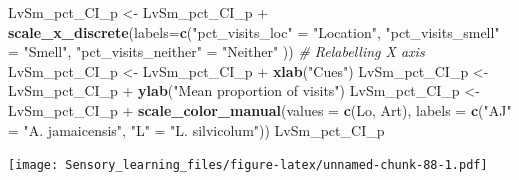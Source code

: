 \documentclass[]{article}
\newenvironment{Shaded}{\begin{snugshade}}{\end{snugshade}}
\newcommand{\KeywordTok}[1]{\textcolor[rgb]{0.13,0.29,0.53}{\textbf{{#1}}}}
\newcommand{\DataTypeTok}[1]{\textcolor[rgb]{0.13,0.29,0.53}{{#1}}}
\newcommand{\StringTok}[1]{\textcolor[rgb]{0.31,0.60,0.02}{{#1}}}
\newcommand{\CommentTok}[1]{\textcolor[rgb]{0.56,0.35,0.01}{\textit{{#1}}}}
\newcommand{\NormalTok}[1]{{#1}}
\begin{document}
\begin{Shaded}
\begin{Highlighting}[]
\NormalTok{LvSm_pct_CI_p <-}\StringTok{ }\NormalTok{LvSm_pct_CI_p +}\StringTok{ }\KeywordTok{scale_x_discrete}\NormalTok{(}\DataTypeTok{labels=}\KeywordTok{c}\NormalTok{(}\StringTok{"pct_visits_loc"} \NormalTok{=}\StringTok{ "Location"}\NormalTok{, }\StringTok{"pct_visits_smell"} \NormalTok{=}\StringTok{ "Smell"}\NormalTok{,}
                              \StringTok{"pct_visits_neither"} \NormalTok{=}\StringTok{ "Neither"} \NormalTok{))  }\CommentTok{# Relabelling X axis}
\NormalTok{LvSm_pct_CI_p <-}\StringTok{ }\NormalTok{LvSm_pct_CI_p +}\StringTok{ }\KeywordTok{xlab}\NormalTok{(}\StringTok{"Cues"}\NormalTok{)}
\NormalTok{LvSm_pct_CI_p <-}\StringTok{ }\NormalTok{LvSm_pct_CI_p +}\StringTok{ }\KeywordTok{ylab}\NormalTok{(}\StringTok{"Mean proportion of visits"}\NormalTok{)}
\NormalTok{LvSm_pct_CI_p <-}\StringTok{ }\NormalTok{LvSm_pct_CI_p +}\StringTok{ }\KeywordTok{scale_color_manual}\NormalTok{(}\DataTypeTok{values =} \KeywordTok{c}\NormalTok{(Lo, Art), }\DataTypeTok{labels =} \KeywordTok{c}\NormalTok{(}\StringTok{"AJ"} \NormalTok{=}\StringTok{ "A. jamaicensis"}\NormalTok{, }\StringTok{"L"} \NormalTok{=}\StringTok{ "L. silvicolum"}\NormalTok{))}
\NormalTok{LvSm_pct_CI_p                    }
\end{Highlighting}
\end{Shaded}

\texttt{[image: Sensory\_learning\_files/figure-latex/unnamed-chunk-88-1.pdf]}
\end{document}
